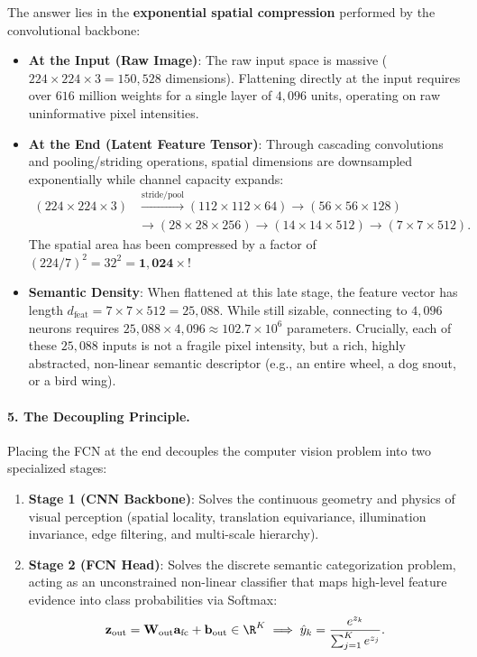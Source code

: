 The answer lies in the \textbf{exponential spatial compression} performed by the convolutional backbone:
\begin{itemize}[leftmargin=*]
  \item \textbf{At the Input (Raw Image)}: The raw input space is massive ($224 \times 224 \times 3 = 150,528$ dimensions). Flattening directly at the input requires over $616$ million weights for a single layer of $4,096$ units, operating on raw uninformative pixel intensities.
  \item \textbf{At the End (Latent Feature Tensor)}: Through cascading convolutions and pooling/striding operations, spatial dimensions are downsampled exponentially while channel capacity expands:
  \begin{equation}
  \begin{aligned}
  (224 \times 224 \times 3) &\xrightarrow{\text{stride/pool}} (112 \times 112 \times 64) \to (56 \times 56 \times 128) \\
  &\to (28 \times 28 \times 256) \to (14 \times 14 \times 512) \to (7 \times 7 \times 512).
  \end{aligned}
  \end{equation}
  The spatial area has been compressed by a factor of $(224 / 7)^2 = 32^2 = \mathbf{1,024\times}$!
  \item \textbf{Semantic Density}: When flattened at this late stage, the feature vector has length $d_{\text{feat}} = 7 \times 7 \times 512 = 25,088$. While still sizable, connecting to $4,096$ neurons requires $25,088 \times 4,096 \approx 102.7 \times 10^6$ parameters. Crucially, each of these $25,088$ inputs is not a fragile pixel intensity, but a rich, highly abstracted, non-linear semantic descriptor (e.g., an entire wheel, a dog snout, or a bird wing). 
\end{itemize}

\paragraph{5. The Decoupling Principle.}
Placing the FCN at the end decouples the computer vision problem into two specialized stages:
\begin{enumerate}[noitemsep]
  \item \textbf{Stage 1 (CNN Backbone)}: Solves the continuous geometry and physics of visual perception (spatial locality, translation equivariance, illumination invariance, edge filtering, and multi-scale hierarchy).
  \item \textbf{Stage 2 (FCN Head)}: Solves the discrete semantic categorization problem, acting as an unconstrained non-linear classifier that maps high-level feature evidence into class probabilities via Softmax:
  \begin{equation}
  \mathbf{z}_{\text{out}} = \mathbf{W}_{\text{out}} \mathbf{a}_{\text{fc}} + \mathbf{b}_{\text{out}} \in \R^K \implies \hat{y}_k = \frac{e^{z_k}}{\sum_{j=1}^K e^{z_j}}.
  \end{equation}
\end{enumerate}

